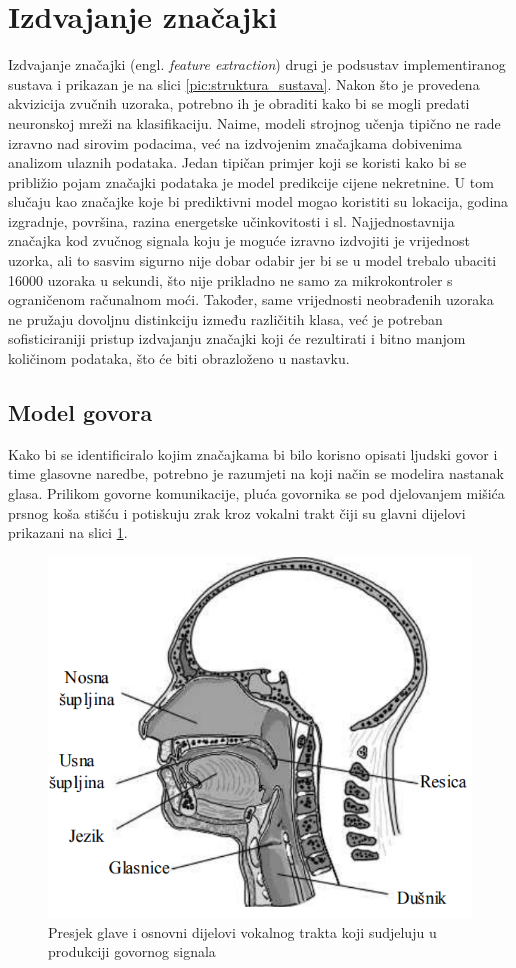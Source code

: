 \section{Izdvajanje značajki}
\label{sec:gen}

Izdvajanje značajki (engl. \textit{feature extraction}) drugi je podsustav implementiranog sustava i prikazan je na slici 
\ref{pic:struktura_sustava}. Nakon što je provedena akvizicija
zvučnih uzoraka, potrebno ih je obraditi kako bi se mogli predati neuronskoj mreži 
na klasifikaciju. Naime, modeli strojnog učenja tipično ne rade izravno nad sirovim 
podacima, već na izdvojenim značajkama dobivenima analizom ulaznih podataka. Jedan 
tipičan primjer koji se koristi kako bi se 
približio pojam značajki podataka je model predikcije cijene
nekretnine. U tom slučaju kao značajke koje bi prediktivni model mogao koristiti su lokacija,
godina izgradnje, površina, razina energetske učinkovitosti i sl. 
Najjednostavnija značajka kod zvučnog signala koju je moguće izravno izdvojiti je vrijednost 
uzorka, ali to sasvim sigurno nije dobar odabir jer bi se u model trebalo ubaciti 16000 
uzoraka u sekundi, što nije prikladno ne samo za mikrokontroler s ograničenom računalnom 
moći. Također, same vrijednosti neobrađenih uzoraka ne pružaju dovoljnu distinkciju između 
različitih klasa, već je potreban sofisticiraniji pristup izdvajanju značajki koji će 
rezultirati i bitno manjom količinom podataka, što će biti obrazloženo u nastavku. 

\subsection{Model govora}
\label{sec:speech}

Kako bi se identificiralo kojim značajkama bi bilo korisno opisati ljudski govor i time glasovne naredbe,
potrebno je razumjeti na koji način se modelira nastanak glasa. Prilikom govorne komunikacije,
pluća govornika se pod djelovanjem mišića prsnog koša stišću i potiskuju zrak kroz
vokalni trakt čiji su glavni dijelovi prikazani na slici \ref{pic:glas}.

\begin{figure}[htb]
    \centering
    \includegraphics[width=0.60\linewidth]{Chapters/struktura_sustava/generiranje_znacajki/glas.png} 
    \caption{Presjek glave i osnovni dijelovi vokalnog trakta koji sudjeluju u produkciji govornog signala \cite{petrinovic2002}}
    \label{pic:glas}
\end{figure}


